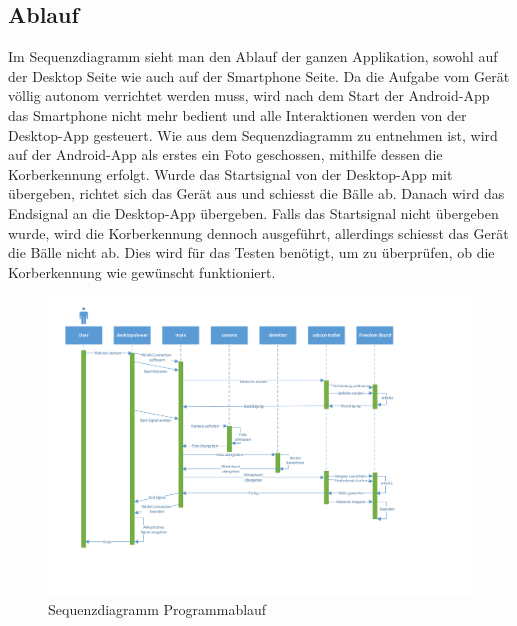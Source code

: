 \subsection{Ablauf}

Im Sequenzdiagramm sieht man den Ablauf der ganzen Applikation, sowohl auf der Desktop 
Seite wie auch auf der Smartphone Seite. Da die Aufgabe vom Gerät völlig autonom verrichtet 
werden muss, wird nach dem Start der Android-App das Smartphone nicht mehr bedient 
und alle Interaktionen werden von der Desktop-App gesteuert. 
Wie aus dem Sequenzdiagramm zu entnehmen ist, wird auf der Android-App als erstes ein 
Foto geschossen, mithilfe dessen die Korberkennung erfolgt. 
\newline
Wurde das Startsignal von der Desktop-App mit übergeben, richtet sich das Gerät aus und schiesst die Bälle ab. 
Danach wird das Endsignal an die Desktop-App übergeben.
Falls das Startsignal nicht übergeben wurde, wird die Korberkennung dennoch ausgeführt, 
allerdings schiesst das Gerät die Bälle nicht ab. Dies wird für das Testen benötigt, um 
zu überprüfen, ob die Korberkennung wie gewünscht funktioniert.


\begin{figure}[h!]
	\includegraphics[width=\textwidth]	{Enddokumentation/Bilder/Sequenzdiagramm_PREN2_v1.pdf}
	\centering
	\caption{Sequenzdiagramm Programmablauf}
	\label{abb:SequenzdiagrammSoftware}
\end{figure}


            

